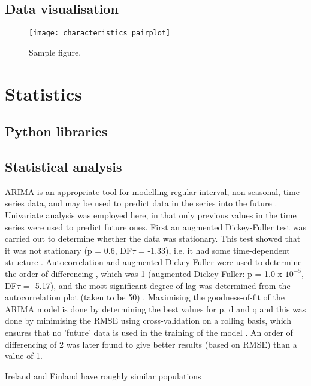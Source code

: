 \documentclass[hidelinks,12pt,oneside]{report} %
\begin{document}
\subsection{Data visualisation}

\begin{figure}[!ht]
	\centering
	\vspace{.4218cm}
		\texttt{[image: characteristics\_pairplot]}	\captionsetup{justification=justified,width=1\linewidth}
	\caption{Sample figure.}
\label{fig:characteristics_pairplot}
\end{figure}



\section{Statistics}
\subsection{Python libraries}


\subsection{Statistical analysis}
ARIMA is an appropriate tool for modelling regular-interval, non-seasonal, time-series data, and may be used to predict data in the series into the future \citep{MSc}. Univariate analysis was employed here, in that only previous values in the time series were used to predict future ones. First an augmented Dickey-Fuller test was carried out to determine whether the data was stationary. This test showed that it was not stationary (p = 0.6, DF$\tau$ = -1.33), i.e. it had some time-dependent structure \citep{DF}. Autocorrelation and augmented Dickey-Fuller were used to determine the order of differencing \citep{Raval}, which was 1 (augmented Dickey-Fuller: p = 1.0 x $10^{-5}$, DF$\tau$ = -5.17), and the most significant degree of lag was determined from the autocorrelation plot (taken to be 50) \citep{Raval, Nadeem}. Maximising the goodness-of-fit of the ARIMA model is done by determining the best values for p, d and q and this was done by minimising the RMSE \citep{Raval, SaS} using cross-validation on a rolling basis, which ensures that no 'future' data is used in the training of the model \citep{SS, Hyn}. An order of differencing of 2 was later found to give better results (based on RMSE) than a value of 1.

Ireland and Finland have roughly similar populations
\end{document}
